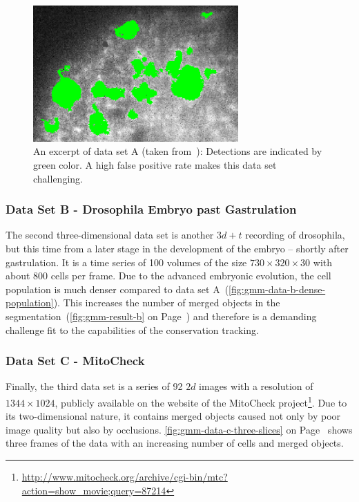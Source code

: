 \begin{figure}
    \centering
    \includegraphics[width=0.7\textwidth]{images/gmm/data/A/dataA_false_positive.png}
    \caption[An excerpt of data set A - detections]{An excerpt of data set A
        (taken from~\citet{schiegg_13_conservation}): Detections are indicated by green color. A high
        false positive rate makes this data set challenging.}
    \label{fig:gmm-data-a-false-positive}
\end{figure}



\subsubsection{Data Set B - Drosophila Embryo past Gastrulation}
The second three-dimensional data set is another $3d+t$ recording of drosophila, but this time from
a later stage in the development of the embryo -- shortly after gastrulation. It is a time series of
100 volumes of the size $730 \times 320 \times 30$ with about 800 cells per frame. Due to the
advanced embryonic evolution, the cell population is much denser compared to data set
A~(\cref{fig:gmm-data-b-dense-population}). This increases the number of merged objects in the
segmentation~(\cref{fig:gmm-result-b} on Page~\pageref{fig:gmm-data-b-dense-population}) and therefore is
a demanding challenge fit to the capabilities of the conservation tracking.


\subsubsection{Data Set C - MitoCheck}
\label{subsubsec:gmm-data-c}
Finally, the third data set is a series of 92 $2d$ images with a resolution of $1344\times1024$,
publicly available on the website of the MitoCheck
project\footnote{\label{note1}\url{http://www.mitocheck.org/archive/cgi-bin/mtc?action=show_movie;query=87214}}. Due
to its two-dimensional nature, it contains merged objects caused not only by poor image quality but
also by occlusions. \cref{fig:gmm-data-c-three-slices} on Page~\pageref{fig:gmm-data-c-three-slices}
shows three frames of the data with an increasing number of cells and merged objects.





